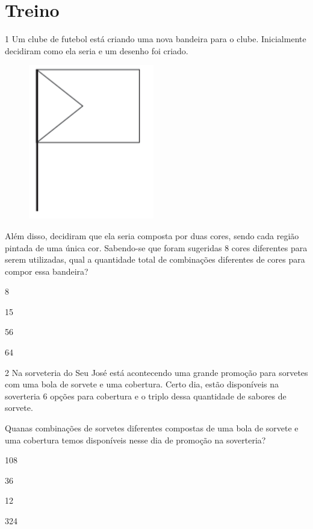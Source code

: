 \pagebreak
\section*{Treino}

\num{1} Um clube de futebol está criando uma nova bandeira para o clube.
Inicialmente decidiram como ela seria e um desenho foi criado.

\begin{figure}[htpb!]
\centering
\includegraphics[width=.35\textwidth]{./imgs/mat16.png}
\end{figure}

Além disso, decidiram que ela seria composta por duas cores, sendo cada
região pintada de uma única cor. Sabendo-se que foram sugeridas 8 cores
diferentes para serem utilizadas, qual a quantidade total de combinações
diferentes de cores para compor essa bandeira?

\begin{minipage}{.5\textwidth}
\begin{escolha}
\item
  8
\item
  15
\item
  56
\item
  64
\end{escolha}
\end{minipage}



\num{2} Na sorveteria do Seu José está acontecendo uma grande promoção
para sorvetes com uma bola de sorvete e uma cobertura. Certo dia, estão disponíveis na soverteria 6 opções para cobertura e o triplo dessa quantidade de sabores de sorvete.

Quanas combinações de sorvetes diferentes compostas de uma bola de
sorvete e uma cobertura temos disponíveis nesse dia de promoção na soverteria?

\begin{minipage}{.5\textwidth}
\begin{escolha}
\item
  108
\item
  36
\item
  12
\item
  324
\end{escolha}
\end{minipage}


